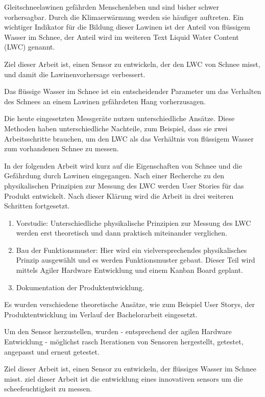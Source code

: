 Gleitschneelawinen gefährden Menschenleben und sind bisher schwer vorhersagbar. Durch die Klimaerwärmung werden sie häufiger auftreten. Ein wichtiger Indikator für die Bildung dieser Lawinen ist der Anteil von flüssigem Wasser im Schnee, der Anteil wird im weiteren Text Liquid Water Content (LWC) genannt.

Ziel dieser Arbeit ist, einen Sensor zu entwickeln, der den LWC von Schnee misst, und damit die Lawinenvorhersage verbessert.


Das flüssige Wasser im Schnee ist ein entscheidender Parameter um das Verhalten des Schnees an einem Lawinen gefährdeten Hang  vorherzusagen. 

Die heute eingesetzten Messgeräte nutzen unterschiedliche Ansätze. Diese Methoden haben unterschiedliche Nachteile, zum Beispiel, dass sie zwei Arbeitsschritte brauchen, um den LWC als das Verhältnis von flüssigem Wasser zum vorhandenen Schnee zu messen. 

In der folgenden Arbeit wird kurz auf die Eigenschaften von Schnee und die Gefährdung durch Lawinen eingegangen. Nach einer Recherche zu den physikalischen Prinzipien zur Messung des LWC werden User Stories für das Produkt entwickelt. Nach dieser Klärung wird die Arbeit in drei weiteren Schritten fortgesetzt.

\begin{enumerate}
\item Vorstudie: Unterschiedliche physikalische Prinzipien zur Messung des LWC werden erst theoretisch und dann praktisch miteinander verglichen.

\item Bau der Funktionsmuster: Hier wird ein vielversprechendes physikalisches Prinzip ausgewählt und es werden Funktionsmuster gebaut. Dieser Teil wird mittels Agiler Hardware Entwicklung und einem Kanban Board geplant.

\item Dokumentation der Produktentwicklung.
\end{enumerate}

Es wurden verschiedene theoretische Ansätze, wie zum Beispiel User Storys, der Produktentwicklung im Verlauf der Bachelorarbeit eingesetzt.

Um den Sensor herzustellen, wurden - entsprechend der agilen Hardware Entwicklung - möglichst rasch Iterationen von Sensoren hergestellt, getestet, angepasst und erneut getestet.


\iffalse


Ziel dieser Arbeit ist, einen Sensor zu entwickeln, der flüssiges Wasser im Schnee misst.
ziel dieser Arbeit ist die entwicklung eines innovativen sensors um die scheefeuchtigkeit zu messen.

